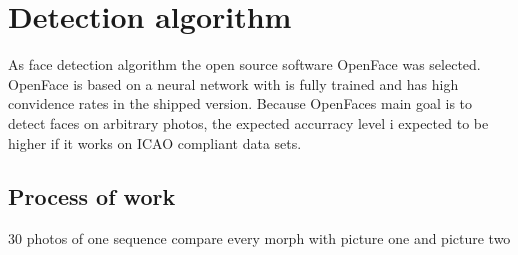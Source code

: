 \section{Detection algorithm} %
As face detection algorithm the open source software OpenFace was selected. OpenFace is based on a neural network with is fully trained and has high convidence rates in the shipped version. Because OpenFaces main goal is to detect faces on arbitrary photos, the expected accurracy level i expected to be higher if it works on ICAO compliant data sets. 

\subsection{Process of work}
30 photos of one sequence \newline
compare every morph with picture one and picture two



